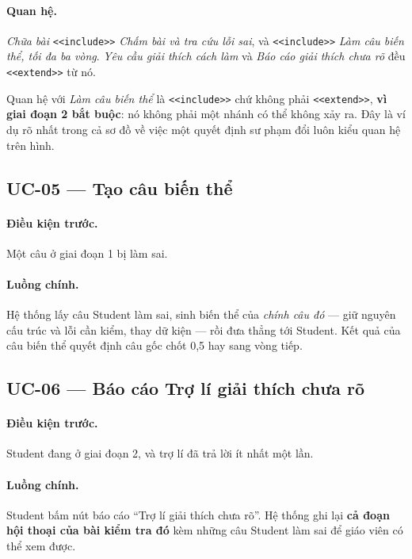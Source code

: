 \paragraph{Quan hệ.} \emph{Chữa bài} \texttt{<<include>>} \emph{Chấm bài và tra cứu lỗi sai}, và
\texttt{<<include>>} \emph{Làm câu biến thể, tối đa ba vòng}. \emph{Yêu cầu giải thích cách làm}
và \emph{Báo cáo giải thích chưa rõ} đều \texttt{<<extend>>} từ nó.

Quan hệ với \emph{Làm câu biến thể} là \texttt{<<include>>} chứ không phải \texttt{<<extend>>},
\textbf{vì giai đoạn 2 bắt buộc}: nó không phải một nhánh có thể không xảy ra. Đây là ví dụ rõ nhất
trong cả sơ đồ về việc một quyết định sư phạm đổi luôn kiểu quan hệ trên hình.

\subsection{UC-05 --- Tạo câu biến thể}

\paragraph{Điều kiện trước.} Một câu ở giai đoạn 1 bị làm sai.

\paragraph{Luồng chính.} Hệ thống lấy câu Student làm sai, sinh biến thể của \emph{chính câu
đó} --- giữ nguyên cấu trúc và lỗi cần kiểm, thay dữ kiện --- rồi đưa thẳng tới Student. Kết quả của
câu biến thể quyết định câu gốc chốt 0,5 hay sang vòng tiếp.

\subsection{UC-06 --- Báo cáo Trợ lí giải thích chưa rõ}

\paragraph{Điều kiện trước.} Student đang ở giai đoạn 2, và trợ lí đã trả lời ít nhất một lần.

\paragraph{Luồng chính.} Student bấm nút báo cáo ``Trợ lí giải thích chưa rõ''. 
Hệ thống ghi lại \textbf{cả đoạn hội thoại của bài kiểm tra đó} kèm những câu Student
làm sai để giáo viên có thể xem được.
